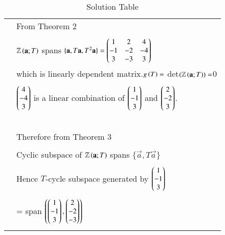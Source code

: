 \documentclass[journal,12pt]{IEEEtran}
\begin{document}
\begin{longtable}{|l|l|}
&From Theorem 2\\
&\\
&$\mathbb{Z}\left(\mathbf{a};T\right)$ spans $\{\mathbf{a},T\mathbf{a},T^2\mathbf{a}\}=\begin{pmatrix}1&2&4\\-1&-2&-4\\3&-3&3\end{pmatrix}$\\
&which is linearly dependent matrix.$g\left(T\right)=$ det$\left(\mathbb{Z}\left(\mathbf{a};T\right)\right)=$0\\
&\\
&$\begin{pmatrix}4\\-4\\3\end{pmatrix}$ is a linear combination of $\begin{pmatrix}1\\-1\\3\end{pmatrix}$ and $\begin{pmatrix}2\\-2\\3\end{pmatrix}$.\\
&\\
&\\

&\\
&\\
\hline
&\\
& Therefore from Theorem 3\\
&\\
&Cyclic subspace of $\mathbb{Z}\left(\mathbf{a};T\right)$ spans $\{\vec{a} , T\vec{a}\}$\\
&\\
&Hence $T$-cycle subspace generated by $\begin{pmatrix}1\\-1\\3\end{pmatrix}$\\
&\\
&= span $\left(\begin{pmatrix}1\\-1\\3\end{pmatrix},\begin{pmatrix}2\\-2\\-3\end{pmatrix}\right)$ \\

\hline

\caption{Solution Table}
\label{table:2}
\end{longtable}
\end{document}
